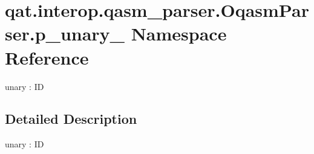 \hypertarget{namespaceqat_1_1interop_1_1qasm__parser_1_1OqasmParser_1_1p__unary__3}{\section{qat.\-interop.\-qasm\-\_\-parser.\-Oqasm\-Parser.\-p\-\_\-unary\-\_ Namespace Reference}
\label{namespaceqat_1_1interop_1_1qasm__parser_1_1OqasmParser_1_1p__unary__3}
}


unary \-: I\-D  




\subsection{Detailed Description}
unary \-: I\-D 